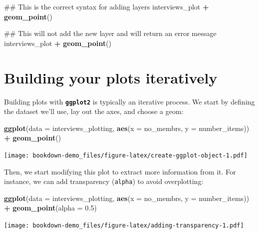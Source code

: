 \documentclass[]{book}
\newenvironment{Shaded}{\begin{snugshade}}{\end{snugshade}}
\newcommand{\KeywordTok}[1]{\textcolor[rgb]{0.13,0.29,0.53}{\textbf{#1}}}
\newcommand{\DataTypeTok}[1]{\textcolor[rgb]{0.13,0.29,0.53}{#1}}
\newcommand{\FloatTok}[1]{\textcolor[rgb]{0.00,0.00,0.81}{#1}}
\newcommand{\StringTok}[1]{\textcolor[rgb]{0.31,0.60,0.02}{#1}}
\newcommand{\OperatorTok}[1]{\textcolor[rgb]{0.81,0.36,0.00}{\textbf{#1}}}
\newcommand{\NormalTok}[1]{#1}
\begin{document}
\begin{Shaded}
\begin{Highlighting}[]
\NormalTok{## This is the correct syntax for adding layers}
\NormalTok{interviews_plot }\OperatorTok{+}
\StringTok{    }\KeywordTok{geom_point}\NormalTok{()}

\NormalTok{## This will not add the new layer and will return an error message}
\NormalTok{interviews_plot}
\OperatorTok{+}\StringTok{ }\KeywordTok{geom_point}\NormalTok{()}
\end{Highlighting}
\end{Shaded}

\section{Building your plots
iteratively}\label{building-your-plots-iteratively}

Building plots with \textbf{\texttt{ggplot2}} is typically an iterative
process. We start by defining the dataset we'll use, lay out the axes,
and choose a geom:

\begin{Shaded}
\begin{Highlighting}[]
\KeywordTok{ggplot}\NormalTok{(}\DataTypeTok{data =}\NormalTok{ interviews_plotting, }\KeywordTok{aes}\NormalTok{(}\DataTypeTok{x =}\NormalTok{ no_membrs, }\DataTypeTok{y =}\NormalTok{ number_items)) }\OperatorTok{+}
\StringTok{    }\KeywordTok{geom_point}\NormalTok{()}
\end{Highlighting}
\end{Shaded}

\texttt{[image: bookdown-demo\_files/figure-latex/create-ggplot-object-1.pdf]}

Then, we start modifying this plot to extract more information from it.
For instance, we can add transparency (\texttt{alpha}) to avoid
overplotting:

\begin{Shaded}
\begin{Highlighting}[]
\KeywordTok{ggplot}\NormalTok{(}\DataTypeTok{data =}\NormalTok{ interviews_plotting, }\KeywordTok{aes}\NormalTok{(}\DataTypeTok{x =}\NormalTok{ no_membrs, }\DataTypeTok{y =}\NormalTok{ number_items)) }\OperatorTok{+}
\StringTok{    }\KeywordTok{geom_point}\NormalTok{(}\DataTypeTok{alpha =} \FloatTok{0.5}\NormalTok{)}
\end{Highlighting}
\end{Shaded}

\texttt{[image: bookdown-demo\_files/figure-latex/adding-transparency-1.pdf]}
\end{document}
